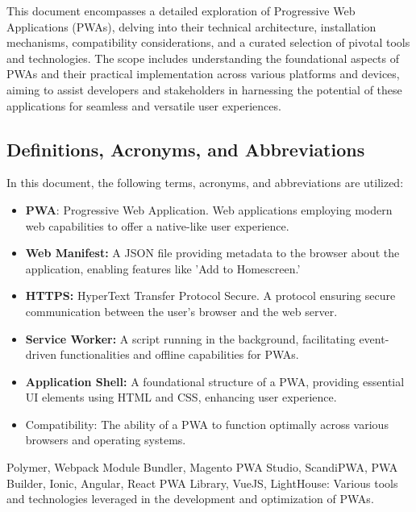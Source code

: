 \documentclass[12pt,a4paper, twosite]{article}
\begin{document}
This document encompasses a detailed exploration 
of Progressive Web Applications (PWAs), delving 
into their technical architecture, installation 
mechanisms, compatibility considerations, and a curated 
selection of pivotal tools and technologies. The scope includes 
understanding the foundational aspects of PWAs and their practical 
implementation across various platforms and devices, aiming to assist 
developers and stakeholders in harnessing the potential of these 
applications for seamless and versatile user experiences.


\subsection{Definitions, Acronyms, and Abbreviations}
\label{sec:orgb158e36}

In this document, the following terms, acronyms, and abbreviations are utilized:

\begin{itemize}

\item \textbf{PWA}: Progressive Web Application. Web applications employing modern web capabilities to offer a native-like user experience.

\item \textbf{Web Manifest:} A JSON file providing metadata to the browser about the application, enabling features like 'Add to Homescreen.'

\item \textbf{HTTPS: }HyperText Transfer Protocol Secure. A protocol ensuring secure communication between the user's browser and the web server.

\item \textbf{Service Worker: }A script running in the background, facilitating event-driven functionalities and offline capabilities for PWAs.

\item \textbf{Application Shell: }A foundational structure of a PWA, providing essential UI elements using HTML and CSS, enhancing user experience.

\item Compatibility: The ability of a PWA to function optimally across various browsers and operating systems.

\end{itemize}
Polymer, Webpack Module Bundler, Magento PWA Studio, ScandiPWA, PWA Builder, Ionic, Angular, React PWA Library, VueJS, LightHouse: Various tools and technologies leveraged in the development and optimization of PWAs.
\end{document}
